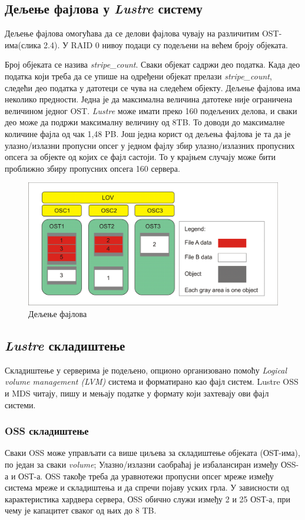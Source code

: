 \subsection{Дељење фајлова у   \textit{Lustre}  систему}
Дељење фајлова омогућава да се делови фајлова чувају на различитим OST-има(слика 2.4). 
У RAID 0 нивоу подаци су подељени на већем броју објеката.

Број објеката се назива \textit{stripe\_count}. Сваки објекат садржи део податка. Када део податка који треба да се упише на одређени објекат прелази \textit{stripe\_count}, 
следећи део податка у датотеци се чува на следећем објекту. Дељење фајлова има  неколико предности. Једна је да максимална величина датотеке није 
ограничена величином једног OST. \textit{Lustre} може имати преко 160 подељених делова, и сваки део може да подржи максималну величину од 8TB. То доводи до максималне количине фајла од чак 1,48 PB. Још једна корист од дељења фајлова је та да је улазно/излазни пропусни опсег у једном фајлу 
збир улазно/излазних пропусних опсега за објекте од којих се фајл састоји. То у крајњем случају може бити проближно збиру пропусних опсега 160 сервера.


\begin{figure}[h!]
  \centering
      \includegraphics[width=1\textwidth]{slike/lustre_striping.png}
  \caption{Дељење фајлова}
\end{figure}

\subsection{\textit{Lustre} складиштење}
Складиштење у серверима је подељено, опционо организовано помоћу \textit{Logical
volume management (LVM)} система и форматирано као фајл систем. Lustre OSS и MDS
читају, пишу и мењају податке у формату који захтевају ови фајл системи.

\subsubsection{OSS складиштење}
Сваки OSS може управљати са више циљева за складиштење објеката (ОSТ-има), по један за сваки \textit{volume};
Улазно/излазни саобраћај је  избалансиран између ОSS-а и ОSТ-а. ОSS такође  треба да уравнотежи
пропусни опсег мреже између система мреже и складиштења и да спречи појаву уских грла. У зависности од карактеристика хардвера сервера, ОSS обично служи између 2 и 25 ОSТ-а, при чему је капацитет сваког од њих до 8 TB.


